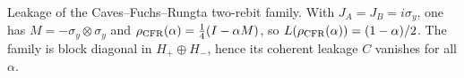 \caption{Leakage of the Caves--Fuchs--Rungta two-rebit family. With \(J_A=J_B=i\sigma_y\), one has \(M=-\sigma_y\otimes\sigma_y\) and \(\rho_{\rm CFR}(\alpha)=\tfrac14(I-\alpha M)\), so \(L(\rho_{\rm CFR}(\alpha))=(1-\alpha)/2\). The family is block diagonal in \(H_+\oplus H_-\), hence its coherent leakage \(C\) vanishes for all \(\alpha\).}
